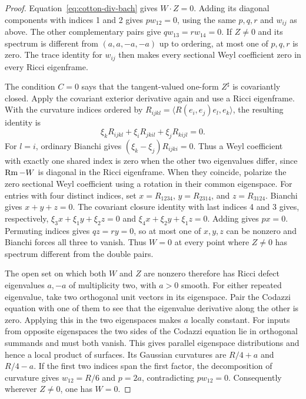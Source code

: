 \begin{proof}
Equation~\eqref{eq:cotton-div-bach} gives \(W\cdot Z=0\).
Adding its diagonal components with indices 1 and 2 gives
\(p w_{12}=0\), using the same \(p,q,r\) and \(w_{ij}\) as above.
The other complementary pairs give \(q w_{13}=r w_{14}=0\).
If \(Z\ne0\) and its spectrum is different from \((a,a,-a,-a)\)
up to ordering, at most one of \(p,q,r\) is zero. The trace
identity for \(w_{ij}\) then makes every sectional Weyl coefficient
zero in every Ricci eigenframe.

The condition \(C=0\) says that the tangent-valued one-form
\(Z^\sharp\) is covariantly closed. Apply the covariant exterior
derivative again and use a Ricci eigenframe. With the curvature
indices ordered by \(R_{ijkl}=\langle R(e_i,e_j)e_l,e_k\rangle\),
the resulting identity is
\[
 \xi_kR_{ijkl}+\xi_iR_{jkil}+\xi_jR_{kijl}=0 .
\]
For \(l=i\), ordinary Bianchi gives
\((\xi_k-\xi_j)R_{ijki}=0\). Thus a Weyl coefficient with exactly
one shared index is zero when the other two eigenvalues differ,
since \(\operatorname{Rm}-W\) is diagonal in the Ricci eigenframe. When they
coincide, polarize the zero sectional Weyl coefficient using a
rotation in their common eigenspace. For entries with four
distinct indices, set \(x=R_{1234}\), \(y=R_{2314}\), and
\(z=R_{3124}\). Bianchi gives \(x+y+z=0\). The covariant closure
identity with last indices 4 and 3 gives, respectively,
\(\xi_3x+\xi_1y+\xi_2z=0\) and
\(\xi_4x+\xi_2y+\xi_1z=0\). Adding gives \(px=0\).
Permuting indices gives \(qz=ry=0\), so at most one of \(x,y,z\)
can be nonzero and Bianchi forces all three to vanish. Thus
\(W=0\) at every point where \(Z\ne0\) has spectrum different
from the double pairs.

The open set on which both \(W\) and \(Z\) are nonzero therefore
has Ricci defect eigenvalues \(a,-a\) of multiplicity two, with
\(a>0\) smooth. For either repeated eigenvalue, take two
orthogonal unit vectors in its eigenspace. Pair the Codazzi
equation with one of them to see that the eigenvalue derivative
along the other is zero. Applying this in the two eigenspaces
makes \(a\) locally constant. For inputs from opposite
eigenspaces the two sides of the Codazzi equation lie in
orthogonal summands and must both vanish. This gives parallel
eigenspace distributions and hence a local product of surfaces.
Its Gaussian curvatures are \(R/4+a\) and \(R/4-a\). If the first
two indices span the first factor, the decomposition of curvature
gives \(w_{12}=R/6\) and \(p=2a\), contradicting \(p w_{12}=0\).
Consequently wherever \(Z\ne0\), one has \(W=0\).


\end{proof}
